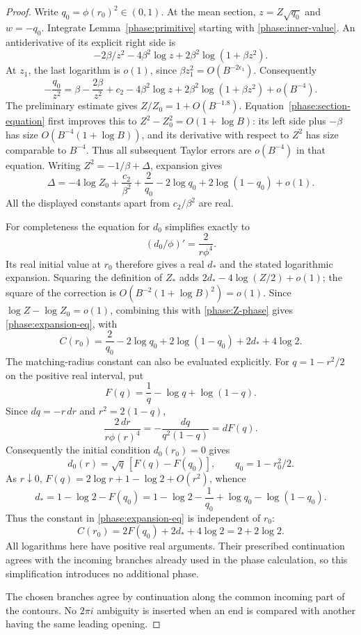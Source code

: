 \begin{proof}
Write $q_0=\phi(r_0)^2\in(0,1)$.  At the mean section,
$z=Z\sqrt{q_0}$ and $w=-q_0$.
Integrate Lemma~\ref{phase:primitive} starting with
\eqref{phase:inner-value}.  An antiderivative of its explicit right side is
\[
 -2\beta/z^2-4\beta^2\log z+2\beta^2\log(1+\beta z^2).
\]
At $z_1$, the last logarithm is $o(1)$, since
$\beta z_1^2=O(B^{-2\epsilon_1})$.
Consequently
\begin{equation}
 -\frac{q_0}{z^2}=\beta-\frac{2\beta}{z^2}+c_2
       -4\beta^2\log z+2\beta^2\log(1+\beta z^2)+o(B^{-4}).
 \label{phase:section-equation}
\end{equation}
The preliminary estimate gives $Z/Z_0=1+O(B^{-1.8})$.
Equation~\eqref{phase:section-equation} first improves this to
$Z^2-Z_0^2=O(1+\log B)$: its left side plus $-\beta$ has size
$O(B^{-4}(1+\log B))$, and its derivative with respect to $Z^2$ has size
comparable to $B^{-4}$.  Thus all subsequent Taylor errors are $o(B^{-4})$
in that equation.  Writing $Z^2=-1/\beta+\Delta$, expansion gives
\begin{equation}
 \Delta=-4\log Z_0+\frac{c_2}{\beta^2}
       +\frac2{q_0}-2\log q_0+2\log(1-q_0)+o(1).
 \label{phase:Z-phase}
\end{equation}
All the displayed constants apart from $c_2/\beta^2$ are real.

For completeness the equation for $d_0$ simplifies exactly to
\begin{equation}
           (d_0/\phi)'=\frac2{r\phi^4}.
 \label{phase:d0}
\end{equation}
Its real initial value at $r_0$ therefore gives a real $d_*$ and the
stated logarithmic expansion.  Squaring the definition of $Z_*$ adds
$2d_*-4\log(Z/2)+o(1)$; the square of the correction is
$O(B^{-2}(1+\log B)^2)=o(1)$.
Since $\log Z-\log Z_0=o(1)$, combining this with
\eqref{phase:Z-phase} gives \eqref{phase:expansion-eq}, with
\[
 C(r_0)=\frac2{q_0}-2\log q_0+2\log(1-q_0)+2d_*+4\log2.
\]
The matching-radius constant can also be evaluated explicitly.
For $q=1-r^2/2$ on the positive real interval, put
\[
       F(q)=\frac1q-\log q+\log(1-q).
\]
Since $dq=-r\,dr$ and $r^2=2(1-q)$,
\[
 \frac{2\,dr}{r\phi(r)^4}
       =-\frac{dq}{q^2(1-q)}=dF(q).
\]
Consequently the initial condition $d_0(r_0)=0$ gives
\[
 d_0(r)=\sqrt q\,[F(q)-F(q_0)],\qquad q_0=1-r_0^2/2.
\]
As $r\downarrow0$, $F(q)=2\log r+1-\log2+O(r^2)$, whence
\[
 d_*=1-\log2-F(q_0)
       =1-\log2-\frac1{q_0}+\log q_0-\log(1-q_0).
\]
Thus the constant in \eqref{phase:expansion-eq} is independent of $r_0$:
\[
 C(r_0)=2F(q_0)+2d_*+4\log2=2+2\log2.
\]
All logarithms here have positive real arguments.  Their prescribed
continuation agrees with the incoming branches already used in the
phase calculation, so this simplification introduces no additional phase.

The chosen branches agree by continuation along the common incoming
part of the contours.  No $2\pi i$ ambiguity is inserted when an end
is compared with another having the same leading opening.
\end{proof}

